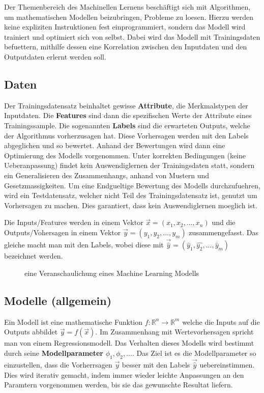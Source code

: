 \documentclass[../main]{subfiles}
\begin{document}
Der Themenbereich des Machinellen Lernens beschäftigt sich mit Algorithmen, um mathematischen Modellen beizubringen, Probleme zu loesen.
Hierzu werden keine expliziten Instruktionen fest einprogrammiert, sondern das Modell wird trainiert und optimiert sich von selbst.
Dabei wird das Modell mit Trainingsdaten befuettern, mithilfe dessen eine Korrelation zwischen den Inputdaten und den Outputdaten erlernt werden soll.

\subsection{Daten}

Der Trainingsdatensatz beinhaltet gewisse \textbf{Attribute}, die Merkmalstypen der Inputdaten. Die \textbf{Features} sind dann die spezifischen Werte der Attribute eines Trainingssample.
Die sogenannten \textbf{Labels} sind die erwarteten Outputs, welche der Algorithmus vorherzusagen hat. Diese Vorhersagen werden mit den Labels abgeglichen und so bewertet.
Anhand der Bewertungen wird dann eine Optimierung des Modells vorgenommen.
Unter korrekten Bedingungen (keine Ueberanpassung) findet kein Auswendiglernen der Trainingsdaten statt, sondern ein Generalisieren des Zusammenhangs, anhand von Mustern und Gesetzmassigkeiten.
Um eine Endgueltige Bewertung des Modells durchzufuehren, wird ein Testdatensatz, welcher nicht Teil des Trainingsdatensatz ist, genutzt um Vorhersagen zu machen. Dies garantiert, dass kein Auswendiglernen moeglich ist.

Die Inputs/Features werden in einem Vektor $\vec{x}=(x_1,x_2,...,x_n)$ und die Outputs/Vohersagen in einem Vektor $\vec{y}=(y_1,y_2,...,y_m)$ zusammengefasst.  Das gleiche macht man mit den Labels, wobei diese mit $\vec{\hat{y}}=(\hat{y}_1,\hat{y_2},...,\hat{y}_m)$ bezeichnet werden.


\begin{figure}[h!]
    \centering
    \begin{tikzpicture}[node distance=5cm,auto]
        
    \end{tikzpicture}
    
    \caption{eine Veranschaulichung eines Machine Learning Modells}
\end{figure}

\subsection{Modelle (allgemein)}
Ein Modell ist eine mathematische Funktion $\mathit{f}\colon \mathbb{R}^n \to \mathbb{R}^m$ welche die Inputs auf die Outputs abbildet $\vec{y}=\mathit{f}(\vec{x})$.
Im Zusammenhang mit Wertevorhersagen spricht man von einem Regressionsmodell.
Das Verhalten dieses Modells wird bestimmt durch seine \textbf{Modellparameter} $\phi_1, \phi_2, ...$. Das Ziel ist es die Modellparameter so einzustellen, dass die Vorherrsagen $\vec{y}$ besser mit den Labels $\vec{\hat{y}}$ uebereinstimmen. Dies wird iterativ gemacht, indem immer wieder leichte Anpassungen an den Paramtern vorgenommen werden, bis sie das gewunschte Resultat liefern. 
\end{document}
